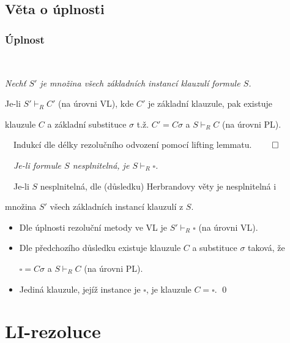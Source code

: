 \subsection{Věta o úplnosti}\todo

\subsubsection*{Úplnost}
    {\bf {}}\ \ {\it Nechť $S'$ je množina všech základních instancí klauzulí formule $S$.
    \smallskip
    
    Je-li $S'\vdash_R C'$ (na úrovni VL), kde $C'$ je základní klauzule, pak existuje
    \smallskip
    
    klauzule $C$ a základní substituce $\sigma$ t.ž. $C'=C\sigma$ a $S\vdash_R C$ (na úrovni PL).}
    \medskip
    
    {\it {}}\ \ Indukcí dle délky rezolučního odvození pomocí lifting lemmatu. $\qed$
    \bigskip
    
    {\bf {}}\ \ {\it Je-li formule $S$ nesplnitelná, je $S\vdash_R \square$.}
    \medskip
    
    {\it {}}\ \ Je-li $S$ nesplnitelná, dle (důsledku) Herbrandovy věty je nesplnitelná i
    \smallskip
    
    množina $S'$ všech základních instancí klauzulí z $S$.
    \vspace{0.5mm}
    
    \begin{itemize}
    \item Dle úplnosti rezoluční metody ve VL je $S' \vdash_R \square$ (na úrovni VL).
    \smallskip
    
    \item Dle předchozího důsledku existuje klauzule $C$ a substituce $\sigma$ taková, že
    \smallskip
    
    $\square = C\sigma$ a $S\vdash_R C$ (na úrovni PL).
    \smallskip
    
    \item Jediná klauzule, jejíž instance je $\square$, je klauzule $C=\square$. \qed
    \end{itemize}
    
    
   


\section{LI-rezoluce}\label{section:predicate-LI-resolution}
\todo

